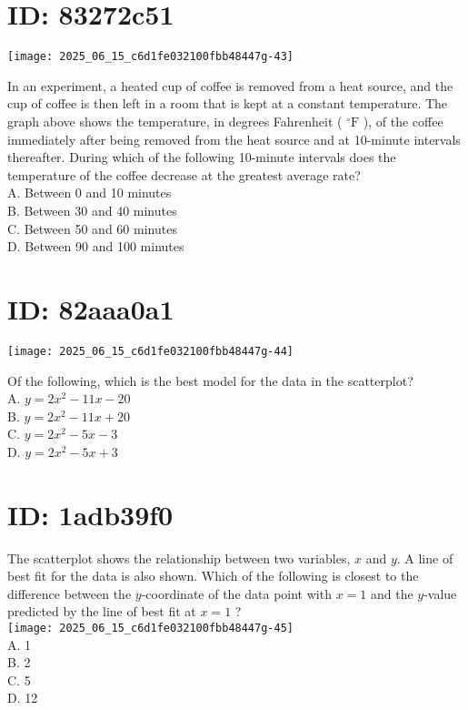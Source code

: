 \section*{ID: 83272c51}
\begin{center}
\texttt{[image: 2025\_06\_15\_c6d1fe032100fbb48447g-43]}
\end{center}

In an experiment, a heated cup of coffee is removed from a heat source, and the cup of coffee is then left in a room that is kept at a constant temperature. The graph above shows the temperature, in degrees Fahrenheit ( ${ }^{\circ} \mathrm{F}$ ), of the coffee immediately after being removed from the heat source and at 10-minute intervals thereafter. During which of the following 10-minute intervals does the temperature of the coffee decrease at the greatest average rate?\\
A. Between 0 and 10 minutes\\
B. Between 30 and 40 minutes\\
C. Between 50 and 60 minutes\\
D. Between 90 and 100 minutes

\section*{ID: 82aaa0a1}
\begin{center}
\texttt{[image: 2025\_06\_15\_c6d1fe032100fbb48447g-44]}
\end{center}

Of the following, which is the best model for the data in the scatterplot?\\
A. $y=2 x^{2}-11 x-20$\\
B. $y=2 x^{2}-11 x+20$\\
C. $y=2 x^{2}-5 x-3$\\
D. $y=2 x^{2}-5 x+3$

\section*{ID: 1adb39f0}
The scatterplot shows the relationship between two variables, $x$ and $y$. A line of best fit for the data is also shown. Which of the following is closest to the difference between the $y$-coordinate of the data point with $x=1$ and the $y$-value predicted by the line of best fit at $x=1$ ?\\
\texttt{[image: 2025\_06\_15\_c6d1fe032100fbb48447g-45]}\\
A. 1\\
B. 2\\
C. 5\\
D. 12


